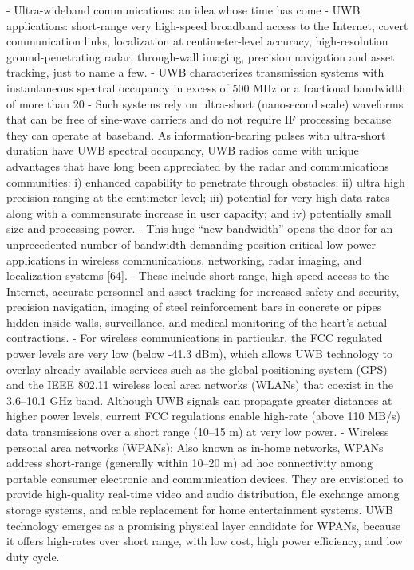 \cite{yang2004uwbcom}
	- Ultra-wideband communications: an idea whose time has come
	- UWB applications: short-range very high-speed broadband access to the Internet, covert communication links, localization at centimeter-level accuracy, high-resolution ground-penetrating radar, through-wall imaging, precision navigation and asset tracking, just to name a few.
	- UWB characterizes transmission systems with instantaneous spectral occupancy in excess of 500 MHz or a fractional bandwidth of more than 20%
	- Such systems rely on ultra-short (nanosecond scale) waveforms that can be free of sine-wave carriers and do not require IF processing because they can operate at baseband. As information-bearing pulses with ultra-short duration have UWB spectral occupancy, UWB radios come with unique advantages that have long been appreciated by the radar and communications communities: i) enhanced capability to penetrate through obstacles; ii) ultra high precision ranging at the centimeter level; iii) potential for very high data rates along with a commensurate increase in user capacity; and iv) potentially small size and processing power.
	- This huge “new bandwidth” opens the door for an unprecedented number of bandwidth-demanding position-critical low-power applications in wireless communications, networking, radar imaging, and localization systems [64].
	- These include short-range, high-speed access to the Internet, accurate personnel and asset tracking for increased safety and security, precision navigation, imaging of steel reinforcement bars in concrete or pipes hidden inside walls, surveillance, and medical monitoring of the heart’s actual contractions.
	- For wireless communications in particular, the FCC regulated power levels are very low (below -41.3 dBm), which allows UWB technology to overlay already available services such as the global positioning system (GPS) and the IEEE 802.11 wireless local area networks (WLANs) that coexist in the 3.6--10.1 GHz band. Although UWB signals can propagate greater distances at higher power levels, current FCC regulations enable high-rate (above 110 MB/s) data transmissions over a short range (10--15 m) at very low power.
	- Wireless personal area networks (WPANs): Also known as in-home networks, WPANs address short-range (generally within 10--20 m) ad hoc connectivity among portable consumer electronic and communication devices. They are envisioned to provide high-quality real-time video and audio distribution, file exchange among storage systems, and cable replacement for home entertainment systems. UWB technology emerges as a promising physical layer candidate for WPANs, because it offers high-rates over short range, with low cost, high power efficiency, and low duty cycle.

